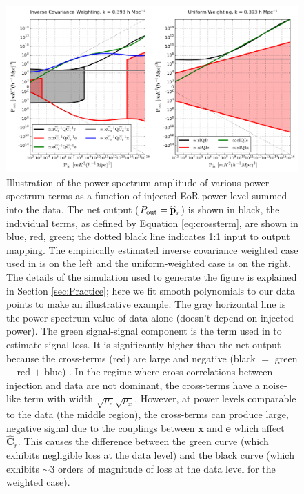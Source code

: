 \documentclass[preprint2,numberedappendix,tighten]{aastex6}  %
\begin{document}
\begin{figure}
	\centering
	\includegraphics[width=1\textwidth]{plots/sigloss_terms.png}
	\caption{Illustration of the power spectrum amplitude of various power spectrum terms as a function of injected EoR power level summed into the 
data. The net output ($P_{\rm out}=\widehat{\textbf{p}}_r$) is shown in black, the individual terms, as defined by Equation 
\eqref{eq:crossterm},  are shown in blue, red, green; the dotted black line indicates 1:1 input to output mapping.  The 
empirically estimated inverse covariance weighted case used in  is on the left and the uniform-weighted 
case is on the right. The details of the simulation used to generate the figure is explained in Section 
\ref{sec:Practice}; here we fit smooth polynomials to our data points to make an illustrative example.   The gray 
horizontal line is the power spectrum value of data alone (doesn't depend on injected power). The green signal-signal 
component is the term used in  to estimate signal loss. It is significantly higher 
than the net output because the cross-terms (red) are large and negative (black $=$ green $+$ red $+$ blue) . In the 
regime where cross-correlations between injection and data are not dominant, the cross-terms have a noise-like 
term with width $\sqrt{p_e}\sqrt{p_x}$. However, at power levels comparable to the data (the middle region), the cross-terms can produce large, negative signal due to the couplings between $\textbf{x}$ and $\textbf{e}$ which affect 
$\widehat{\textbf{C}}_{r}$. This causes the difference between the green curve (which exhibits negligible loss at 
the data level) and the black curve (which exhibits $\sim$$3$ orders of magnitude of loss at the data level for 
the weighted case). }
	\label{fig:sigloss_terms}
\end{figure}
\end{document}
